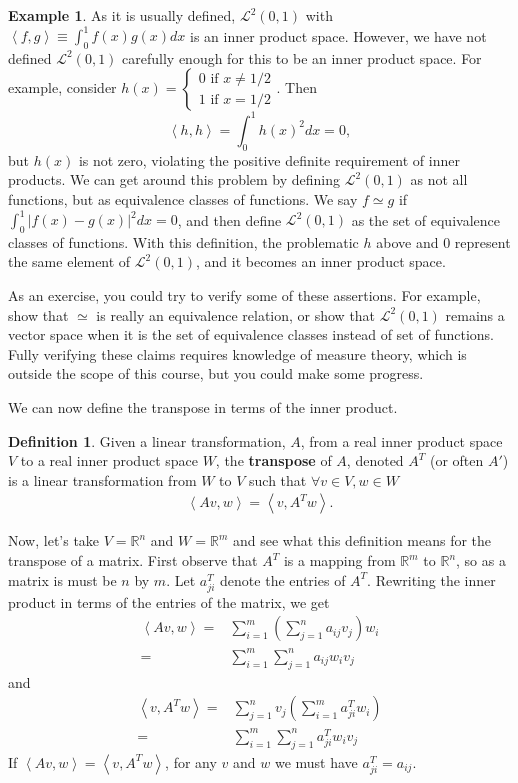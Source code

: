 \documentclass[12pt,reqno]{amsart}
\def\R{\mathbb{R}}
\newcommand{\iprod}[2]{\left\langle {#1} , {#2} \right\rangle}
\theoremstyle{definition}
\newtheorem{definition}{Definition}[section]
\newtheorem{example}{Example}[section]
\begin{document}
\begin{example}
  As it is usually defined, $\mathcal{L}^2(0,1)$ with $\iprod{f}{g}
  \equiv \int_0^1 f(x) g(x) dx$ is an inner product space. However, we
  have not defined $\mathcal{L}^2(0,1)$ carefully enough for this to
  be an inner product space. For example, consider $h(x)
  = \begin{cases} 0 \text{ if } x \neq 1/2 \\
    1 \text{ if } x = 1/2
  \end{cases}$. Then 
  \[ 
  \iprod{h}{h} = \int_0^1 h(x)^2 dx = 0,
  \]
  but $h(x)$ is not zero, violating the positive definite requirement
  of inner products. We can get around this problem by defining
  $\mathcal{L}^2(0,1)$ as not all functions, but as equivalence
  classes of functions. We say $f \simeq g$ if $\int_0^1 |f(x) -
  g(x)|^2 dx = 0$, and then define $\mathcal{L}^2(0,1)$ as the set of
  equivalence classes of functions. With this definition, the
  problematic $h$ above and $0$ represent the same element of
  $\mathcal{L}^2(0,1)$, and it becomes an inner product space. 

  As an exercise, you could try to verify some of these
  assertions. For example, show that $\simeq$ is really an equivalence
  relation, or show that $\mathcal{L}^2(0,1)$ remains a vector space
  when it is the set of equivalence classes instead of set of
  functions. Fully verifying these claims requires knowledge of
  measure theory, which is outside the scope of this course, but you
  could make some progress.
\end{example}

We can now define the transpose in terms of the inner product.
\begin{definition}
  Given a linear transformation, $A$, from a real inner product space
  $V$ to a real inner product space $W$, the
  \textbf{transpose} of $A$, denoted $A^T$ (or often $A'$) is a
  linear transformation from $W$ to $V$ such that $\forall v \in V, w
  \in W$
  \begin{align*}
    \iprod{A v}{w} = \iprod{v}{A^T w}.
  \end{align*}
\end{definition}
Now, let's take $V=\R^n$ and $W = \R^m$ and see what this definition
means for the transpose of a matrix. First observe that $A^T$ is a
mapping from $\R^m$ to $\R^n$, so as a matrix is must be $n$ by
$m$. Let $a^T_{ji}$ denote the entries of $A^T$. Rewriting the
inner product in terms of the entries of the matrix, we get
\begin{align*}
  \iprod{Av}{w} = & \sum_{i=1}^m \left(\sum_{j=1}^n a_{ij} v_j \right)
  w_i  \\
  = & \sum_{i=1}^m \sum_{j=1}^n a_{ij} w_i v_j
\end{align*}
and 
\begin{align*}
  \iprod{v}{A^T w} = & \sum_{j=1}^n v_j \left(\sum_{i=1}^m a_{ji}^T
    w_i\right) \\
  = & \sum_{i=1}^m \sum_{j=1}^n a_{ji}^T w_i v_j
\end{align*}
If $\iprod{A v}{w} = \iprod{v}{A^T w} $, for any $v$ and $w$ we must
have $a_{ji}^T = a_{ij}$. 
\end{document}
